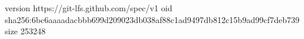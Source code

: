 version https://git-lfs.github.com/spec/v1
oid sha256:6bc6aaaadacbbb699d209023db038af88c1ad9497db812c15b9ad99cf7deb739
size 253248
